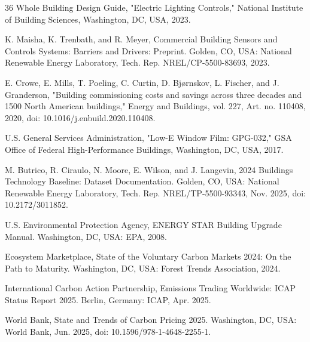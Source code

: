 \documentclass[journal,fleqn]{IEEEtran}
\begin{document}
\begin{thebibliography}{36}
 Whole Building Design Guide, "Electric Lighting Controls," National Institute of Building Sciences, Washington, DC, USA, 2023.

 K. Maisha, K. Trenbath, and R. Meyer, Commercial Building Sensors and Controls Systems: Barriers and Drivers: Preprint. Golden, CO, USA: National Renewable Energy Laboratory, Tech. Rep. NREL/CP-5500-83693, 2023.

 E. Crowe, E. Mills, T. Poeling, C. Curtin, D. Bjørnskov, L. Fischer, and J. Granderson, "Building commissioning costs and savings across three decades and 1500 North American buildings," Energy and Buildings, vol. 227, Art. no. 110408, 2020, doi: 10.1016/j.enbuild.2020.110408.

 U.S. General Services Administration, "Low-E Window Film: GPG-032," GSA Office of Federal High-Performance Buildings, Washington, DC, USA, 2017.

 M. Butrico, R. Ciraulo, N. Moore, E. Wilson, and J. Langevin, 2024 Buildings Technology Baseline: Dataset Documentation. Golden, CO, USA: National Renewable Energy Laboratory, Tech. Rep. NREL/TP-5500-93343, Nov. 2025, doi: 10.2172/3011852.

 U.S. Environmental Protection Agency, ENERGY STAR Building Upgrade Manual. Washington, DC, USA: EPA, 2008.

 Ecosystem Marketplace, State of the Voluntary Carbon Markets 2024: On the Path to Maturity. Washington, DC, USA: Forest Trends Association, 2024.

 International Carbon Action Partnership, Emissions Trading Worldwide: ICAP Status Report 2025. Berlin, Germany: ICAP, Apr. 2025.

 World Bank, State and Trends of Carbon Pricing 2025. Washington, DC, USA: World Bank, Jun. 2025, doi: 10.1596/978-1-4648-2255-1.

\end{thebibliography}
\end{document}
